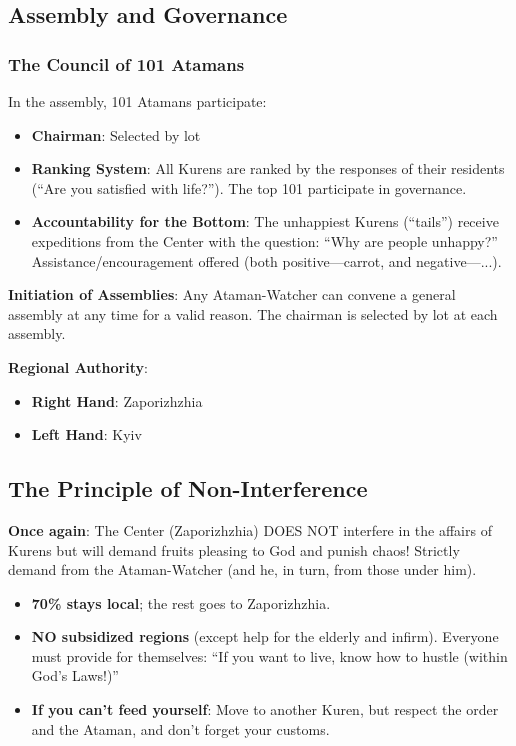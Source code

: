 \documentclass[11pt,a4paper]{article}
\theoremstyle{definition}
\theoremstyle{remark}
\begin{document}
\subsection{Assembly and Governance}

\subsubsection{The Council of 101 Atamans}

In the assembly, 101 Atamans participate:
\begin{itemize}
\item \textbf{Chairman}: Selected by lot
\item \textbf{Ranking System}: All Kurens are ranked by the responses of their residents (``Are you satisfied with life?''). The top 101 participate in governance.
\item \textbf{Accountability for the Bottom}: The unhappiest Kurens (``tails'') receive expeditions from the Center with the question: ``Why are people unhappy?'' Assistance/encouragement offered (both positive—carrot, and negative—...).
\end{itemize}

\textbf{Initiation of Assemblies}: Any Ataman-Watcher can convene a general assembly at any time for a valid reason. The chairman is selected by lot at each assembly.

\textbf{Regional Authority}:
\begin{itemize}
\item \textbf{Right Hand}: Zaporizhzhia
\item \textbf{Left Hand}: Kyiv
\end{itemize}

\subsection{The Principle of Non-Interference}

\textbf{Once again}: The Center (Zaporizhzhia) DOES NOT interfere in the affairs of Kurens but will demand fruits pleasing to God and punish chaos! Strictly demand from the Ataman-Watcher (and he, in turn, from those under him).

\begin{itemize}
\item \textbf{70\% stays local}; the rest goes to Zaporizhzhia.
\item \textbf{NO subsidized regions} (except help for the elderly and infirm). Everyone must provide for themselves: ``If you want to live, know how to hustle (within God's Laws!)''
\item \textbf{If you can't feed yourself}: Move to another Kuren, but respect the order and the Ataman, and don't forget your customs.
\end{itemize}
\end{document}
